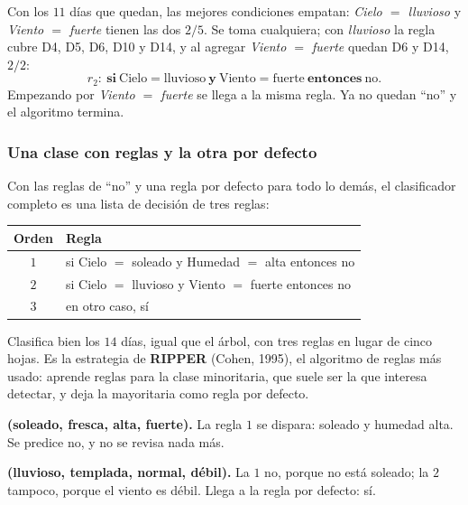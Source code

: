 \documentclass[11pt,letterpaper]{article}
\begin{document}
\begin{ejemplo}
     Con los $11$ días que quedan, las mejores
    condiciones empatan: \textit{Cielo $=$ lluvioso} y \textit{Viento
    $=$ fuerte} tienen las dos $2/5$. Se toma cualquiera; con
    \textit{lluvioso} la regla cubre D4, D5, D6, D10 y D14, y al
    agregar \textit{Viento $=$ fuerte} quedan D6 y D14, $2/2$:
    \[
        r_2: \ \textbf{si}\ \text{Cielo} = \text{lluvioso}\ \textbf{y}\
        \text{Viento} = \text{fuerte}\ \textbf{entonces}\ \text{no} .
    \]
    Empezando por \textit{Viento $=$ fuerte} se llega a la misma regla.
    Ya no quedan ``no'' y el algoritmo termina.
\end{ejemplo}

\subsubsection*{Una clase con reglas y la otra por defecto}

Con las reglas de ``no'' y una regla por defecto para todo lo demás,
el clasificador completo es una lista de decisión de tres reglas:

\begin{center}
\begin{tabular}{cl}
    \toprule
    \textbf{Orden} & \textbf{Regla} \\
    \midrule
    $1$ & si Cielo $=$ soleado y Humedad $=$ alta entonces no \\
    $2$ & si Cielo $=$ lluvioso y Viento $=$ fuerte entonces no \\
    $3$ & en otro caso, sí \\
    \bottomrule
\end{tabular}
\end{center}

Clasifica bien los $14$ días, igual que el árbol, con tres reglas en
lugar de cinco hojas. Es la estrategia de \textbf{RIPPER} (Cohen,
1995), el algoritmo de reglas más usado: aprende reglas para la clase
minoritaria, que suele ser la que interesa detectar, y deja la
mayoritaria como regla por defecto.

\begin{ejemplo}
    \textbf{(soleado, fresca, alta, fuerte).} La regla $1$ se dispara:
    soleado y humedad alta. Se predice no, y no se revisa nada más.

    \textbf{(lluvioso, templada, normal, débil).} La $1$ no, porque no
    está soleado; la $2$ tampoco, porque el viento es débil. Llega a la
    regla por defecto: sí.
\end{ejemplo}
\end{document}
